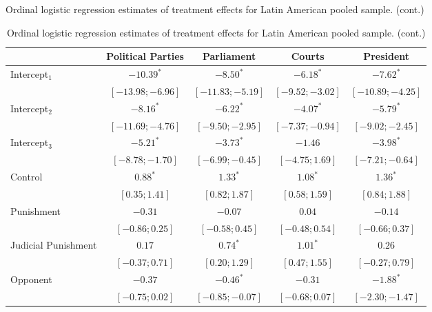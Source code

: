 \begin{table}[h]
\begin{center}
\caption
*
{Ordinal logistic regression estimates of treatment effects for Latin American pooled sample. (cont.)}
\caption{Ordinal logistic regression estimates of treatment effects for Latin American pooled sample. (cont.)}
\begin{threeparttable}
\begin{tabular}{l c c c c}
\hline
 & Political Parties & Parliament & Courts & President \\
\hline
Intercept$_1$            & $-10.39^{*}$       & $-8.50^{*}$        & $-6.18^{*}$       & $-7.62^{*}$        \\
                         & $ [-13.98; -6.96]$ & $ [-11.83; -5.19]$ & $ [-9.52; -3.02]$ & $ [-10.89; -4.25]$ \\
Intercept$_2$            & $-8.16^{*}$        & $-6.22^{*}$        & $-4.07^{*}$       & $-5.79^{*}$        \\
                         & $ [-11.69; -4.76]$ & $ [ -9.50; -2.95]$ & $ [-7.37; -0.94]$ & $ [ -9.02; -2.45]$ \\
Intercept$_3$            & $-5.21^{*}$        & $-3.73^{*}$        & $-1.46$           & $-3.98^{*}$        \\
                         & $ [ -8.78; -1.70]$ & $ [ -6.99; -0.45]$ & $ [-4.75;  1.69]$ & $ [ -7.21; -0.64]$ \\
Control                  & $0.88^{*}$         & $1.33^{*}$         & $1.08^{*}$        & $1.36^{*}$         \\
                         & $ [  0.35;  1.41]$ & $ [  0.82;  1.87]$ & $ [ 0.58;  1.59]$ & $ [  0.84;  1.88]$ \\
Punishment               & $-0.31$            & $-0.07$            & $0.04$            & $-0.14$            \\
                         & $ [ -0.86;  0.25]$ & $ [ -0.58;  0.45]$ & $ [-0.48;  0.54]$ & $ [ -0.66;  0.37]$ \\
Judicial Punishment      & $0.17$             & $0.74^{*}$         & $1.01^{*}$        & $0.26$             \\
                         & $ [ -0.37;  0.71]$ & $ [  0.20;  1.29]$ & $ [ 0.47;  1.55]$ & $ [ -0.27;  0.79]$ \\
Opponent                 & $-0.37$            & $-0.46^{*}$        & $-0.31$           & $-1.88^{*}$        \\
                         & $ [ -0.75;  0.02]$ & $ [ -0.85; -0.07]$ & $ [-0.68;  0.07]$ & $ [ -2.30; -1.47]$ \\

\end{tabular}
\end{threeparttable}
\end{center}
\end{table}
